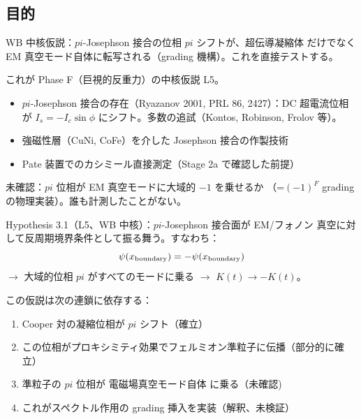 \documentclass[11pt,a4paper]{article}
\def\pi{pi}%
\def\textbf#1{#1}%
\begin{document}
\subsection{目的}

WB 中核仮説：\textbf{$\pi$-Josephson 接合の位相 $\pi$ シフトが、超伝導凝縮体
だけでなく EM 真空モード自体に転写される}（grading 機構）。これを直接テストする。

\textbf{これが Phase F（巨視的反重力）の中核仮説 L5}。

\begin{confirmedbox}
\begin{itemize}
\item $\pi$-Josephson 接合の存在（Ryazanov 2001, PRL 86, 2427）：DC 超電流位相が
  $I_s = -I_c \sin\phi$ にシフト。多数の追試（Kontos, Robinson, Frolov 等）。
\item 強磁性層（CuNi, CoFe）を介した Josephson 接合の作製技術
\item Pate 装置でのカシミール直接測定（Stage 2a で確認した前提）
\end{itemize}

\textbf{未確認}：$\pi$ 位相が EM 真空モードに大域的 $-1$ を乗せるか
（=$(-1)^F$ grading の物理実装）。誰も計測したことがない。
\end{confirmedbox}

\begin{hypothesisbox}
\textbf{Hypothesis 3.1（L5、WB 中核）}：$\pi$-Josephson 接合面が EM/フォノン
真空に対して反周期境界条件として振る舞う。すなわち：
\[
  \psi(x_{\rm boundary}) = -\psi(x_{\rm boundary})
\]
$\to$ 大域的位相 $\pi$ がすべてのモードに乗る $\to$ $K(t) \to -K(t)$。

\textbf{この仮説は次の連鎖に依存する}：
\begin{enumerate}
\item Cooper 対の凝縮位相が $\pi$ シフト（確立）
\item この位相がプロキシミティ効果でフェルミオン準粒子に伝播（部分的に確立）
\item 準粒子の $\pi$ 位相が \textbf{電磁場真空モード自体} に乗る（\textbf{未確認})
\item これがスペクトル作用の grading 挿入を実装（\textbf{解釈、未検証}）
\end{enumerate}
\end{hypothesisbox}
\end{document}
